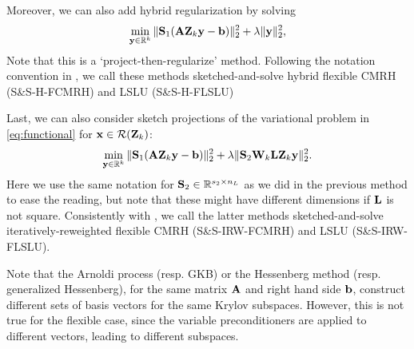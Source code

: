 \documentclass[11pt]{article}
\numberwithin{equation}{section}
\newcommand{\bfA}{{\bf A}}
\newcommand{\bfL}{{\bf L}}
\newcommand{\bfQ}{{\bf Q}}
\newcommand{\bfR}{{\bf R}}
\newcommand{\bfS}{{\bf S}}
\newcommand{\bfW}{{\bf W}}
\newcommand{\bfZ}{{\bf Z}}
\newcommand{\bfb}{{\bf b}}
\newcommand{\bfx}{{\bf x}}
\newcommand{\bfy}{{\bf y}}
\begin{document}
Moreover, we can also add hybrid regularization by solving
\begin{equation}\label{eq:H_sketched_projection_hybrid}
   \min_{\bfy\in\mathbb{R}^k} \| \bfS_1 (\bfA \bfZ_k\bfy -\bfb)\|_2^2+\lambda\|\bfy\|_2^2, %
\end{equation}
Note that this is a `project-then-regularize' method. Following the notation convention in \cite{Sabate2025rand}, we call these methods sketched-and-solve hybrid flexible CMRH (S\&S-H-FCMRH) and LSLU (S\&S-H-FLSLU) 

Last, we can also consider sketch projections of the variational problem in \eqref{eq:functional} for $\bfx \in \mathcal{R}(\bfZ_k)$: 
\begin{equation}\label{eq:H_sketched_projection_IRW}
   \min_{\bfy\in\mathbb{R}^k} \| \bfS_1 (\bfA \bfZ_k\bfy -\bfb)\|_2^2+\lambda\|\bfS_2\bfW_k \bfL \bfZ_k\bfy\|_2^2. %
\end{equation}
Here we use the same notation for $\bfS_2 \in\mathbb{R}^{s_2\times n_{L}}$ as we did in the previous method to ease the reading, but note that these might have different dimensions if $\bfL$ is not square. Consistently with \cite{Sabate2025rand}, we call the latter methods sketched-and-solve iteratively-reweighted flexible CMRH (S\&S-IRW-FCMRH) and LSLU (S\&S-IRW-FLSLU).

Note that the Arnoldi process (resp. GKB) or the Hessenberg method (resp. generalized Hessenberg), for the same matrix $\bfA$ and right hand side $\bfb$, construct different sets of basis vectors for the same Krylov subspaces. However, this is not true for the flexible case, since the variable preconditioners are applied to different vectors, leading to different subspaces.
\end{document}
